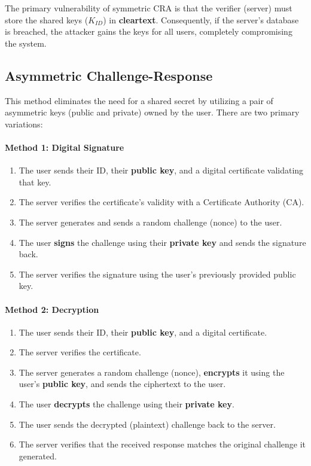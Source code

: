 The primary vulnerability of symmetric CRA is that the verifier (server) must store the shared keys ($K_{ID}$) in \textbf{cleartext}. Consequently, if the server's database is breached, the attacker gains the keys for all users, completely compromising the system.


\subsection{Asymmetric Challenge-Response}
This method eliminates the need for a shared secret by utilizing a pair of asymmetric keys (public and private) owned by the user. There are two primary variations:

\paragraph{Method 1: Digital Signature}
\begin{enumerate}
    \item The user sends their ID, their \textbf{public key}, and a digital certificate validating that key.
    \item The server verifies the certificate's validity with a Certificate Authority (CA).
    \item The server generates and sends a random challenge (nonce) to the user.
    \item The user \textbf{signs} the challenge using their \textbf{private key} and sends the signature back.
    \item The server verifies the signature using the user's previously provided public key.
\end{enumerate}


\paragraph{Method 2: Decryption}
\begin{enumerate}
    \item The user sends their ID, their \textbf{public key}, and a digital certificate.
    \item The server verifies the certificate.
    \item The server generates a random challenge (nonce), \textbf{encrypts} it using the user's \textbf{public key}, and sends the ciphertext to the user.
    \item The user \textbf{decrypts} the challenge using their \textbf{private key}.
    \item The user sends the decrypted (plaintext) challenge back to the server.
    \item The server verifies that the received response matches the original challenge it generated.
\end{enumerate}

